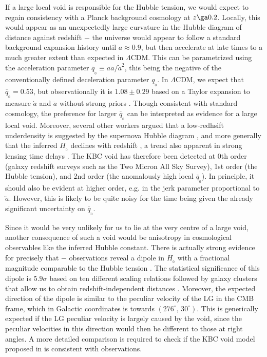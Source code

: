 \documentclass[fleqn,usenatbib,useAMS,onecolumn]{mnras} %
\begin{document}
If a large local void is responsible for the Hubble tension, we would expect to regain consistency with a Planck background cosmology at $z \ga 0.2$. Locally, this would appear as an unexpectedly large curvature in the Hubble diagram of distance against redshift $-$ the universe would appear to follow a standard background expansion history until $a \approx 0.9$, but then accelerate at late times to a much greater extent than expected in $\Lambda$CDM. This can be parametrized using the acceleration parameter $\overline{q}_{_0} \equiv a \ddot{a}/{\dot{a}}^2$, this being the negative of the conventionally defined deceleration parameter $q_{_0}$. In $\Lambda$CDM, we expect that $\overline{q}_{_0} = 0.53$, but observationally it is $1.08 \pm 0.29$ based on a Taylor expansion to measure $\dot{a}$ and $\ddot{a}$ without strong priors \citep{Camarena_2020a, Camarena_2020b}. Though consistent with standard cosmology, the preference for larger $\overline{q}_{_0}$ can be interpreted as evidence for a large local void. Moreover, several other workers argued that a low-redhsift underdensity is suggested by the supernova Hubble diagram \citep{Colgain_2019, Lukovic_2020, Kazantzidis_2020, Castello_2021, Kazantzidis_2021}, and more generally that the inferred $H_{_0}$ declines with redshift \citep[e.g.][]{Krishnan_2020, Krishnan_2021, Dainotti_2021}, a trend also apparent in strong lensing time delays \citep{Wong_2020}. The KBC void has therefore been detected at 0th order (galaxy redshift surveys such as the Two Micron All Sky Survey), 1st order (the Hubble tension), and 2nd order (the anomalously high local $\overline{q}_{_0}$). In principle, it should also be evident at higher order, e.g. in the jerk parameter proportional to $\dddot{a}$. However, this is likely to be quite noisy for the time being given the already significant uncertainty on $\overline{q}_{_0}$.

Since it would be very unlikely for us to lie at the very centre of a large void, another consequence of such a void would be anisotropy in cosmological observables like the inferred Hubble constant. There is actually strong evidence for precisely that $-$ observations reveal a dipole in $H_{_0}$ with a fractional magnitude comparable to the Hubble tension \citep{Migkas_2018}. The statistical significance of this dipole is $5.9\sigma$ based on ten different scaling relations followed by galaxy clusters that allow us to obtain redshift-independent distances \citep[table~3 of][]{Migkas_2021}. Moreover, the expected direction of the dipole is similar to the peculiar velocity of the LG in the CMB frame, which in Galactic coordinates is towards $\left(276^\circ, \, 30^\circ \right)$. This is generically expected if the LG peculiar velocity is largely caused by the void, since the peculiar velocities in this direction would then be different to those at right angles. A more detailed comparison is required to check if the KBC void model proposed in \citet{Haslbauer_2020} is consistent with observations.
\end{document}
